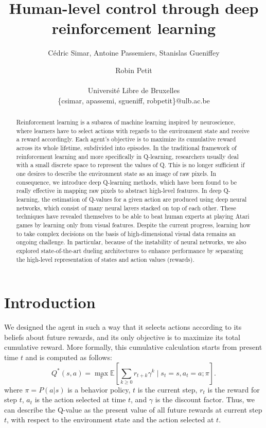 \documentclass[letterpaper]{article}
\title{Human-level control through deep reinforcement learning}
\author{C\'{e}dric Simar, Antoine Passemiers, Stanislas Gueniffey \and Robin Petit \\
\mbox{}\\
Universit\'{e} Libre de Bruxelles \\
\{csimar, apassemi, sgueniff, robpetit\}@ulb.ac.be}
\newcommand{\E}{\mathbb E}
\begin{document}
\maketitle

\begin{abstract}

  Reinforcement learning is a subarea of machine learning inspired by neuroscience, where learners have to select actions with
  regards to the environment state and receive a reward accordingly. Each agent's objective is to maximize its cumulative reward across its whole lifetime,
  subdivided into episodes. In the traditional framework of reinforcement learning and more specifically in Q-learning,
  researchers usually deal with a small discrete space to represent the values of Q. This is no longer sufficient if one desires to describe the environment state
  as an image of raw pixels. In consequence, we introduce deep Q-learning methods, which have been found to be really effective in mapping raw pixels
  to abstract high-level features. In deep Q-learning, the estimation of Q-values for a given action are produced using deep neural networks,
  which consist of many neural layers stacked on top of each other.
  These techniques have revealed themselves to be able to beat human experts at playing Atari games
  by learning only from visual features. Despite the current progress, learning how to take complex decisions on the basis of high-dimensional visual data remains an
  ongoing challenge. In particular, because of the instability of neural networks, we also explored state-of-the-art dueling architectures to enhance performance
  by separating the high-level representation of states and action values (rewards).

\end{abstract}

\section{Introduction}

We designed the agent in such a way that it selects actions according to its beliefs about future rewards, and its only objective is to maximize its total
cumulative reward. More formally, this cumulative calculation starts from present time $t$ and is computed as follows:
\begin{equation}
  Q^{*}(s, a) = \max_{\pi} \E\left[ \sum_{k \geq 0}r_{t+k}\gamma^k \; \big| \; s_t = s, a_t = a; \pi\right].
\end{equation}
where $\pi = P(a | s)$ is a behavior policy, $t$ is the current step, $r_t$ is the reward for step $t$, $a_t$ is the action selected at time $t$,
and $\gamma$ is the discount factor. Thus, we can describe the Q-value as the present value of all future rewards at current step $t$,
with respect to the environment state and the action selected at $t$.
\end{document}
